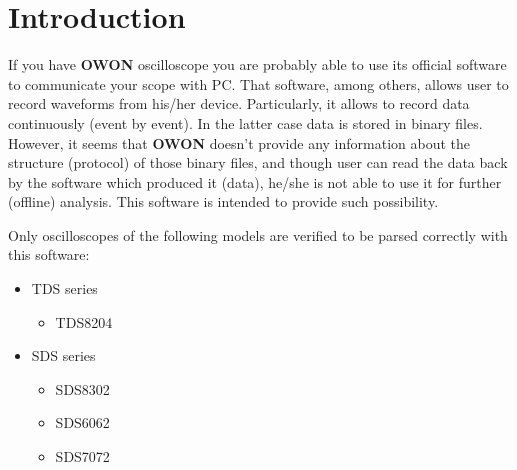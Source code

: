 \section{Introduction}\label{sec:intro}
If you have \textbf{OWON} oscilloscope you are probably able to use its official software
to communicate your scope with PC. That software, among others, allows user to record
waveforms from his/her device. Particularly, it allows to record data continuously (event
by event). In the latter case data is stored in binary files. However, it seems that
\textbf{OWON} doesn't provide any information about the structure (protocol) of those
binary files, and though user can read the data back by the software which produced it
(data), he/she is not able to use it for further (offline) analysis.
This software is intended to provide such possibility.

Only oscilloscopes of the following models are verified to be parsed correctly with
this software:
\begin{itemize}
    \item TDS series
        \begin{itemize}
            \item TDS8204
        \end{itemize}
    \item SDS series
        \begin{itemize}
            \item SDS8302
            \item SDS6062
            \item SDS7072
        \end{itemize}
\end{itemize}


